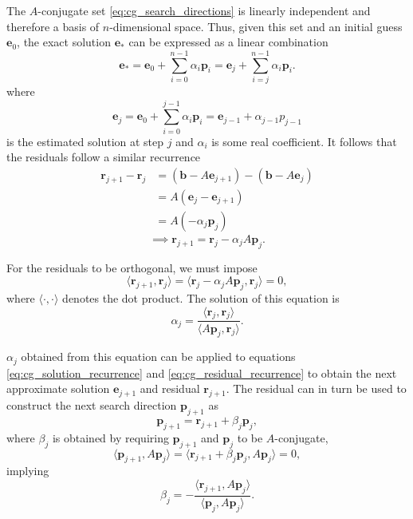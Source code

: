 \documentclass[utf8,english]{gradu3}
\begin{document}
The $A$-conjugate set \eqref{eq:cg_search_directions}
is linearly independent and therefore a basis of $n$-dimensional space.
Thus, given this set and an initial guess $\mathbf{e}_0$,
the exact solution $\mathbf{e}_*$ can be expressed as a linear combination
\[
  \mathbf{e}_*
  = \mathbf{e}_0 + \sum_{i=0}^{n-1} \alpha_i \mathbf{p}_i
  = \mathbf{e}_j + \sum_{i=j}^{n-1} \alpha_i \mathbf{p}_i.
\]
where
\begin{equation}\label{eq:cg_solution_recurrence}
  \mathbf{e}_j = \mathbf{e}_0 + \sum_{i=0}^{j-1} \alpha_i \mathbf{p}_i
  = \mathbf{e}_{j-1} + \alpha_{j-1} p_{j-1}
\end{equation}
is the estimated solution at step $j$
and $\alpha_i$ is some real coefficient.
It follows that the residuals follow a similar recurrence
\begin{align*}
  \mathbf{r}_{j+1} - \mathbf{r}_j
    &= (\mathbf{b} - A\mathbf{e}_{j+1}) - (\mathbf{b} - A\mathbf{e}_j) \\
    &= A(\mathbf{e}_j - \mathbf{e}_{j+1}) \\
    &= A(-\alpha_j \mathbf{p}_j)
\end{align*}
\begin{equation}\label{eq:cg_residual_recurrence}
  \implies \mathbf{r}_{j+1} = \mathbf{r}_j - \alpha_j A\mathbf{p}_j.
\end{equation}

For the residuals to be orthogonal, we must impose
\[
  \langle \mathbf{r}_{j+1}, \mathbf{r}_j \rangle 
  = \langle \mathbf{r}_j - \alpha_j A\mathbf{p}_j, \mathbf{r}_j \rangle = 0,
\]
where $\langle \cdot, \cdot \rangle$ denotes the dot product.
The solution of this equation is
\begin{equation}\label{eq:cg_coef_alpha_first}
  \alpha_j = \frac{\langle \mathbf{r}_j, \mathbf{r}_j \rangle}
  {\langle A\mathbf{p}_j, \mathbf{r}_j \rangle}.
\end{equation}

$\alpha_j$ obtained from this equation can be applied to equations
\eqref{eq:cg_solution_recurrence} and \eqref{eq:cg_residual_recurrence}
to obtain the next approximate solution $\mathbf{e}_{j+1}$
and residual $\mathbf{r}_{j+1}$.
The residual can in turn be used to construct
the next search direction $\mathbf{p}_{j+1}$ as
\begin{equation}\label{eq:cg_search_dir_update}
  \mathbf{p}_{j+1} = \mathbf{r}_{j+1} + \beta_j \mathbf{p}_j,
\end{equation}
where $\beta_j$ is obtained by requiring $\mathbf{p}_{j+1}$
and $\mathbf{p}_j$ to be $A$-conjugate,
\[
  \langle \mathbf{p}_{j+1}, A\mathbf{p}_j \rangle
  = \langle \mathbf{r}_{j+1} + \beta_j \mathbf{p}_j, A\mathbf{p}_j \rangle
  = 0,
\]
implying
\begin{equation}\label{eq:cg_coef_beta_first}
  \beta_j = -\frac{\langle \mathbf{r}_{j+1}, A\mathbf{p}_j \rangle}
  {\langle \mathbf{p}_j, A\mathbf{p}_j \rangle}.
\end{equation}
\end{document}
